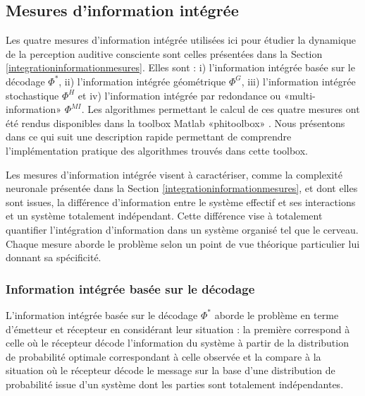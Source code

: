 \subsection{Mesures d'information intégrée}
\label{mesuresinfointegreepratique}

Les quatre mesures d'information intégrée utilisées ici pour étudier la dynamique de la perception auditive consciente sont celles présentées dans la Section \ref{integrationinformationmesures}. 
Elles sont : i) l'information intégrée basée sur le décodage $\Phi^*$, ii) l'information intégrée géométrique $\Phi^G$, iii) l'information intégrée stochastique $\Phi^H$ et iv) l'information intégrée par redondance ou «multi-information» $\Phi^{MI}$. 
Les algorithmes permettant le calcul de ces quatre mesures ont été rendus disponibles dans la toolbox Matlab «phitoolbox» \citep{oizumi2016measuring, toker2019information}. 
Nous présentons dans ce qui suit une description rapide permettant de comprendre l'implémentation pratique des algorithmes trouvés dans cette toolbox. 

Les mesures d'information intégrée visent à caractériser, comme la complexité neuronale présentée dans la Section \ref{integrationinformationmesures}, et dont elles sont issues, la différence d'information entre le système effectif et ses interactions et un système totalement indépendant. 
Cette différence vise à totalement quantifier l'intégration d'information dans un système organisé tel que le cerveau. 
Chaque mesure aborde le problème selon un point de vue théorique particulier lui donnant sa spécificité. 

\subsubsection*{Information intégrée basée sur le décodage}
\label{phistar}

L'information intégrée basée sur le décodage $\Phi^*$ aborde le problème en terme d'émetteur et récepteur en considérant leur situation : la première correspond à celle où le récepteur décode l'information du système à partir de la distribution de probabilité optimale correspondant à celle observée et la compare à la situation où le récepteur décode le message sur la base d'une distribution de probabilité issue d'un système dont les parties sont totalement indépendantes. 

